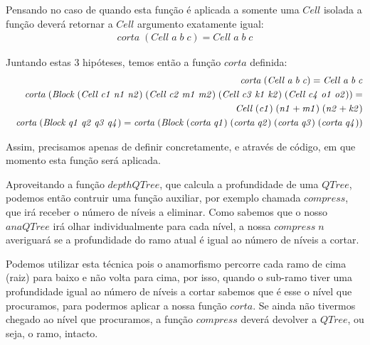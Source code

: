 \documentclass[a4paper]{article}
\newcommand{\Conid}[1]{\mathit{#1}}
\newcommand{\Varid}[1]{\mathit{#1}}
\begin{document}
\begin{enumerate}
Pensando no caso de quando esta função é aplicada a somente uma \ensuremath{\Conid{Cell}} isolada a função deverá
retornar a \ensuremath{\Conid{Cell}} argumento exatamente igual:
\begin{eqnarray*}
       \ensuremath{\Varid{corta}\;(\Conid{Cell}\;\Varid{a}\;\Varid{b}\;\Varid{c})\mathrel{=}\Conid{Cell}\;\Varid{a}\;\Varid{b}\;\Varid{c}}
\end{eqnarray*}

Juntando estas 3 hipóteses, temos então a função \ensuremath{\Varid{corta}} definida:
\begin{eqnarray*}
\start
        \ensuremath{\Varid{corta}\;(\Conid{Cell}\;\Varid{a}\;\Varid{b}\;\Varid{c})\mathrel{=}\Conid{Cell}\;\Varid{a}\;\Varid{b}\;\Varid{c}}
\more
        \ensuremath{\Varid{corta}\;(\Conid{Block}\;(\Conid{Cell}\;\Varid{c1}\;\Varid{n1}\;\Varid{n2})\;(\Conid{Cell}\;\Varid{c2}\;\Varid{m1}\;\Varid{m2})\;(\Conid{Cell}\;\Varid{c3}\;\Varid{k1}\;\Varid{k2})\;(\Conid{Cell}\;\Varid{c4}\;\Varid{o1}\;\Varid{o2}))\mathrel{=}}
\more
        \ensuremath{\Conid{Cell}\;(\Varid{c1})\;(\Varid{n1}\mathbin{+}\Varid{m1})\;(\Varid{n2}\mathbin{+}\Varid{k2})}
\more
        \ensuremath{\Varid{corta}\;(\Conid{Block}\;\Varid{q1}\;\Varid{q2}\;\Varid{q3}\;\Varid{q4})\mathrel{=}\Varid{corta}\;(\Conid{Block}\;(\Varid{corta}\;\Varid{q1})\;(\Varid{corta}\;\Varid{q2})\;(\Varid{corta}\;\Varid{q3})\;(\Varid{corta}\;\Varid{q4}))}
\end{eqnarray*}

Assim, precisamos apenas de definir concretamente, e através de código,
em que momento esta função será aplicada.

Aproveitando a função \ensuremath{\Varid{depthQTree}}, que calcula a profundidade de uma \ensuremath{\Conid{QTree}},
podemos então contruir uma função auxiliar, por exemplo chamada \ensuremath{\Varid{compress}},
que irá receber o número de níveis a eliminar. Como sabemos que o nosso
\ensuremath{\Varid{anaQTree}} irá olhar individualmente para cada nível, a nossa \ensuremath{\Varid{compress}\;\Varid{n}}
averiguará se a profundidade do ramo atual é igual ao número de níveis a cortar.

Podemos utilizar esta técnica pois o anamorfismo percorre cada ramo de cima (raiz)
para baixo e não volta para cima, por isso, quando o sub-ramo tiver uma profundidade
igual ao número de níveis a cortar sabemos que é esse o nível que procuramos,
para podermos aplicar a nossa função \ensuremath{\Varid{corta}}. Se ainda não tivermos chegado
ao nível que procuramos, a função \ensuremath{\Varid{compress}} deverá devolver a \ensuremath{\Conid{QTree}}, ou seja,
o ramo, intacto.


\end{enumerate}
\end{document}
